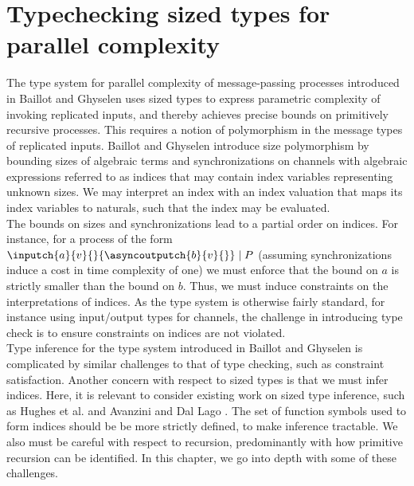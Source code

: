 






%

\chapter{Typechecking sized types for parallel complexity}
The type system for parallel complexity of message-passing processes introduced in Baillot and Ghyselen \cite{BaillotGhyselen2021} uses sized types to express parametric complexity of invoking replicated inputs, and thereby achieves precise bounds on primitively recursive processes. This requires a notion of polymorphism in the message types of replicated inputs. Baillot and Ghyselen introduce size polymorphism by bounding sizes of algebraic terms and synchronizations on channels with algebraic expressions referred to as indices that may contain index variables representing unknown sizes. We may interpret an index with an index valuation that maps its index variables to naturals, such that the index may be evaluated.\\ 

The bounds on sizes and synchronizations lead to a partial order on indices. For instance, for a process of the form $\inputch{a}{v}{}{\asyncoutputch{b}{v}{}} \mid P$ (assuming synchronizations induce a cost in time complexity of one) we must enforce that the bound on $a$ is strictly smaller than the bound on $b$. Thus, we must induce constraints on the interpretations of indices. As the type system is otherwise fairly standard, for instance using input/output types for channels, the challenge in introducing type check is to ensure constraints on indices are not violated.\\

Type inference for the type system introduced in Baillot and Ghyselen \cite{BaillotGhyselen2021} is complicated by similar challenges to that of type checking, such as constraint satisfaction. Another concern with respect to sized types is that we must infer indices. Here, it is relevant to consider existing work on sized type inference, such as Hughes et al. \cite{HughesEtAl1996} and Avanzini and Dal Lago \cite{AvanziniLago2017}. The set of function symbols used to form indices should be be more strictly defined, to make inference tractable. We also must be careful with respect to recursion, predominantly with how primitive recursion can be identified. In this chapter, we go into depth with some of these challenges.

